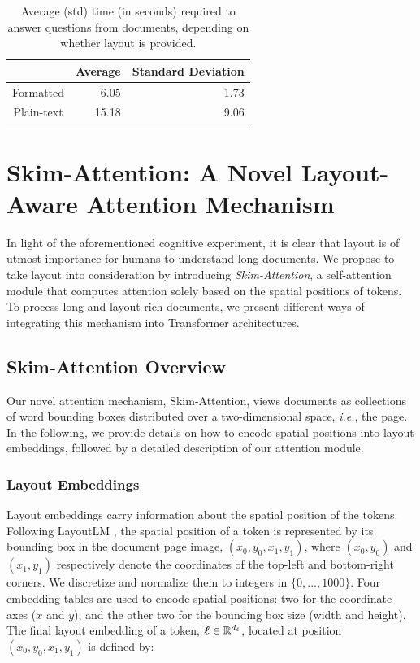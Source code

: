 \begin{table}
\centering \small
    \begin{tabular}{crr}
        \hline
                   & \textbf{Average} & \textbf{Standard Deviation} \\
        \hline 
        Formatted  & 6.05  & 1.73 \\
        Plain-text & 15.18 & 9.06 \\
        \hline
    \end{tabular}
\caption{Average (std) time (in seconds) required to answer questions from documents, depending on whether layout is provided.}
\label{tab:human-eval}
\end{table}

\section{Skim-Attention: A Novel Layout-Aware Attention Mechanism}

In light of the aforementioned cognitive experiment, it is clear that layout is of utmost importance for humans to understand long documents. We propose to take layout into consideration by introducing \emph{Skim-Attention}, a self-attention module that computes attention solely based on the spatial positions of tokens. To process long and layout-rich documents, we present different ways of integrating this mechanism into Transformer architectures.

\subsection{Skim-Attention Overview}

Our novel attention mechanism, Skim-Attention, views documents as collections of word bounding boxes distributed over a two-dimensional space, \textit{i.e.}, the page. In the following, we provide details on how to encode spatial positions into layout embeddings, followed by a detailed description of our attention module.

\subsubsection{Layout Embeddings}

Layout embeddings carry information about the spatial position of the tokens. Following LayoutLM \citep{xu2020layoutlm}, the spatial position of a token is represented by its bounding box in the document page image, $(x_0, y_0, x_1, y_1)$, where $(x_0, y_0)$ and $(x_1, y_1)$ respectively denote the coordinates of the top-left and bottom-right corners. We discretize and normalize them to integers in $\{0, ..., 1000\}$. Four embedding tables are used to encode spatial positions: two for the coordinate axes ($x$ and $y$), and the other two for the bounding box size (width and height). The final layout embedding of a token, $\boldsymbol{\ell} \in \mathbb{R}^{d_{\ell}}$, located at position $(x_0, y_0, x_1, y_1)$ is defined by:
\vspace{-0.5cm}

